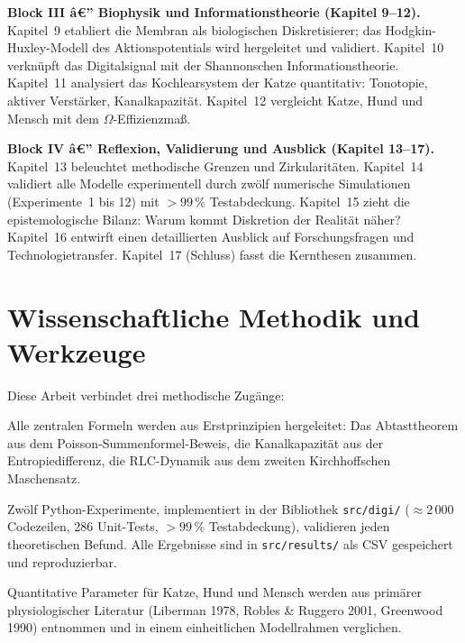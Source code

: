 ﻿\documentclass[12pt,a4paper,titlepage]{report}
\begin{document}
\medskip
\noindent\textbf{Block III â€” Biophysik und Informationstheorie
(Kapitel 9--12).}
Kapitel~9 etabliert die Membran als biologischen Diskretisierer;
das Hodgkin-Huxley-Modell des Aktionspotentials
wird hergeleitet und validiert.
Kapitel~10 verknüpft das Digitalsignal mit der Shannonschen Informationstheorie.
Kapitel~11 analysiert das Kochlearsystem der Katze quantitativ:
Tonotopie, aktiver Verstärker, Kanalkapazität.
Kapitel~12 vergleicht Katze, Hund und Mensch mit dem $\Omega$-Effizienzmaß.

\medskip
\noindent\textbf{Block IV â€” Reflexion, Validierung und Ausblick
(Kapitel 13--17).}
Kapitel~13 beleuchtet methodische Grenzen und Zirkularitäten.
Kapitel~14 validiert alle Modelle experimentell durch zwölf numerische
Simulationen (Experimente~1 bis 12) mit $>99\,\%$ Testabdeckung.
Kapitel~15 zieht die epistemologische Bilanz:
Warum kommt Diskretion der Realität näher?
Kapitel~16 entwirft einen detaillierten Ausblick auf Forschungsfragen
und Technologietransfer.
Kapitel~17 (Schluss) fasst die Kernthesen zusammen.

\section{Wissenschaftliche Methodik und Werkzeuge}

Diese Arbeit verbindet drei methodische Zugänge:

\begin{description}[leftmargin=3em, style=nextline]
	\item[Analytisch-deduktiv.]
		Alle zentralen Formeln werden aus Erstprinzipien hergeleitet:
		Das Abtasttheorem aus dem Poisson-Summenformel-Beweis,
		die Kanalkapazität aus der Entropiedifferenz,
		die RLC-Dynamik aus dem zweiten Kirchhoffschen Maschensatz.
	\item[Numerisch-experimentell.]
		Zwölf Python-Experimente, implementiert in der Bibliothek
		\texttt{src/digi/} ($\approx 2\,000$ Codezeilen, 286 Unit-Tests,
		$>99\,\%$ Testabdeckung), validieren jeden theoretischen Befund.
		Alle Ergebnisse sind in \texttt{src/results/} als CSV gespeichert
		und reproduzierbar.
	\item[Komparativ-biologisch.]
		Quantitative Parameter für Katze, Hund und Mensch werden aus
		primärer physiologischer Literatur
		(Liberman 1978, Robles \& Ruggero 2001, Greenwood 1990)
		entnommen und in einem einheitlichen Modellrahmen verglichen.
\end{description}
\end{document}
